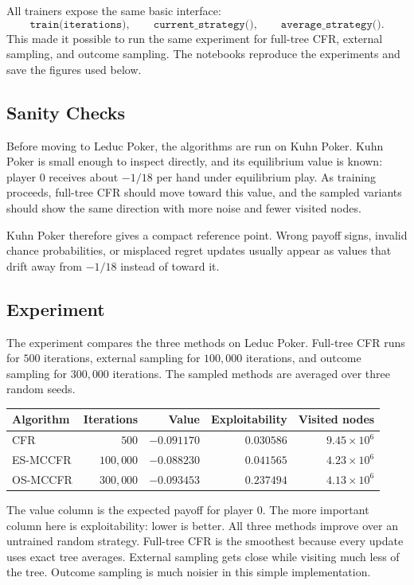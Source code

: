 \documentclass[11pt,reqno,twoside]{article}
\theoremstyle{myThm}
\theoremstyle{myRem}
\theoremstyle{myDef}
\numberwithin{equation}{section}
\begin{document}
All trainers expose the same basic interface:
\[
\texttt{train(iterations)}, \qquad
\texttt{current\_strategy()}, \qquad
\texttt{average\_strategy()}.
\]
This made it possible to run the same experiment for full-tree CFR,
external sampling, and outcome sampling. The notebooks reproduce the
experiments and save the figures used below.

\subsection{Sanity Checks}

Before moving to Leduc Poker, the algorithms are run on Kuhn Poker. Kuhn
Poker is small enough to inspect directly, and its equilibrium value is
known: player 0 receives about $-1/18$ per hand under equilibrium play. As
training proceeds, full-tree CFR should move toward this value, and the
sampled variants should show the same direction with more noise and fewer
visited nodes.

Kuhn Poker therefore gives a compact reference point. Wrong payoff signs,
invalid chance probabilities, or misplaced regret updates usually appear
as values that drift away from $-1/18$ instead of toward it.

\subsection{Experiment}

The experiment compares the three methods on Leduc Poker. Full-tree CFR
runs for $500$ iterations, external sampling for $100{,}000$ iterations,
and outcome sampling for $300{,}000$ iterations. The sampled methods are
averaged over three random seeds.

\begin{center}
\small
\begin{tabular}{lrrrr}
\toprule
Algorithm & Iterations & Value & Exploitability & Visited nodes \\
\midrule
CFR & $500$ & $-0.091170$ & $0.030586$ & $9.45 \times 10^6$ \\
ES-MCCFR & $100{,}000$ & $-0.088230$ & $0.041565$ & $4.23 \times 10^6$ \\
OS-MCCFR & $300{,}000$ & $-0.093453$ & $0.237494$ & $4.13 \times 10^6$ \\
\bottomrule
\end{tabular}
\end{center}

The value column is the expected payoff for player 0. The more important
column here is exploitability: lower is better. All three
methods improve over an untrained random strategy. Full-tree CFR is the
smoothest because every update uses exact tree averages. External sampling
gets close while visiting much less of the tree. Outcome sampling is much
noisier in this simple implementation.
\end{document}
